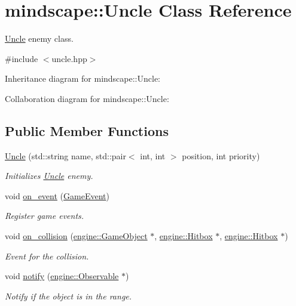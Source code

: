 \hypertarget{classmindscape_1_1_uncle}{}\section{mindscape\+:\+:Uncle Class Reference}
\label{classmindscape_1_1_uncle}


\hyperlink{classmindscape_1_1_uncle}{Uncle} enemy class.  




{\ttfamily \#include $<$uncle.\+hpp$>$}



Inheritance diagram for mindscape\+:\+:Uncle\+:


Collaboration diagram for mindscape\+:\+:Uncle\+:
\subsection*{Public Member Functions}
\begin{DoxyCompactItemize}
\item 
\hyperlink{classmindscape_1_1_uncle_a82e6c0ce316c1c3f7a9620b639907239}{Uncle} (std\+::string name, std\+::pair$<$ int, int $>$ position, int priority)
\begin{DoxyCompactList}\small\item\em Initializes \hyperlink{classmindscape_1_1_uncle}{Uncle} enemy. \end{DoxyCompactList}\item 
void \hyperlink{classmindscape_1_1_uncle_aa85eb4ff4b7b6ed6e1e275259542a43c}{on\+\_\+event} (\hyperlink{class_game_event}{Game\+Event})
\begin{DoxyCompactList}\small\item\em Register game events. \end{DoxyCompactList}\item 
void \hyperlink{classmindscape_1_1_uncle_a363b3577c79c88a0e0d13a907723778c}{on\+\_\+collision} (\hyperlink{classengine_1_1_game_object}{engine\+::\+Game\+Object} $\ast$, \hyperlink{classengine_1_1_hitbox}{engine\+::\+Hitbox} $\ast$, \hyperlink{classengine_1_1_hitbox}{engine\+::\+Hitbox} $\ast$)
\begin{DoxyCompactList}\small\item\em Event for the collision. \end{DoxyCompactList}\item 
void \hyperlink{classmindscape_1_1_uncle_a9bf90a2b110d3d4b6c9b792bc9988999}{notify} (\hyperlink{classengine_1_1_observable}{engine\+::\+Observable} $\ast$)
\begin{DoxyCompactList}\small\item\em Notify if the object is in the range. \end{DoxyCompactList}\end{DoxyCompactItemize}
